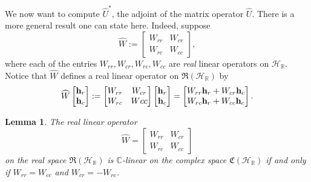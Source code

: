 \documentclass{dis}
\theoremstyle{plain}
\newtheorem{Lemma}[equation]{Lemma}
\theoremstyle{definition}
\def\C{\mathbb{C}}
\def\R{\mathbb{R}}
\renewcommand{\vec}[1]{{\bf #1}}
\newcommand{\0}{{\color{lightgray}0}}
\begin{document}
We now want to compute $\widehat{U}^{*}$, the adjoint of the matrix operator $\widehat{U}$. There is a more general result one can state here. Indeed, suppose
$$\widehat{W} := \begin{bmatrix} W_{rr} & W_{cr}\\ W_{rc} & W_{cc}\end{bmatrix},$$ where each of the entries $W_{rr}, W_{cr}, W_{rc}, W_{cc}$ are {\em real} linear operators on $\mathcal{H}_{\R}$. Notice that $\widehat{W}$ defines a real linear operator on $\mathfrak{R}(\mathcal{H}_{\R})$ by 
$$\widehat{W}  \begin{bmatrix}
\vec{h}_r\\
\vec{h}_c
\end{bmatrix} := \begin{bmatrix}
W_{rr} & W_{cr}\\
W_{rc} & Wcc
\end{bmatrix}
\begin{bmatrix}
\vec{h}_r\\
\vec{h}_c
\end{bmatrix} = \begin{bmatrix} W_{rr} \vec{h}_r + W_{cr} \vec{h}_c\\ W_{rc} \vec{h}_r + W_{cc} \vec{h}_c\end{bmatrix}.$$

\begin{Lemma}\label{C-linearW}
The real linear operator 
$$\widehat{W} = \begin{bmatrix} W_{rr} & W_{cr}\\ W_{rc} & W_{cc}\end{bmatrix}$$ on the real space $\mathfrak{R}(\mathcal{H}_{\R})$ is $\C$-linear on the complex space $\mathfrak{C}(\mathcal{H}_{\R})$ if and only if $W_{rr} = W_{cc}$ and $W_{cr} = - W_{rc}$.
\end{Lemma}
\end{document}
